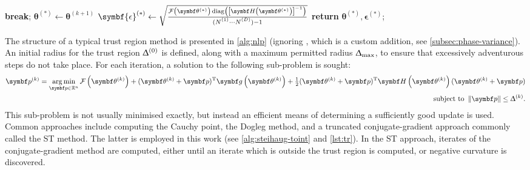 \begin{algorithm}
\begin{algorithmic}[1]
                \EndIf\label{state:neg-amp-end}
                    \State \textbf{break};
                \EndIf
            \EndFor
            \State $\symbf{\theta}^{(*)} \gets \symbf{\theta}^{(k+1)}$
            \State $\symbf{\epsilon}^{(*)} \gets
                \sqrt{
                    \frac
                    {
                        \Fthstar \diag \left(
                            \left[\bdHthstar\right]^{-1}
                        \right)
                    }
                    {(\None \cdots \ND) - 1}
                }$
            \State \textbf{return} $\symbf{\theta}^{(*)}, \symbf{\epsilon}^{(*)}$;
        \EndProcedure
    \end{algorithmic}
\end{algorithm}
The structure of a typical trust region method is presented in
\cref{alg:nlp} (ignoring , which is a custom addition,
see \cref{subsec:phase-variance}). An initial radius for the trust region
$\Updelta^{(0)}$ is defined, along with a maximum permitted radius
$\Updelta_{\text{max}}$, to ensure that excessively adventurous steps do not take place.
For each iteration, a solution to the following sub-problem is sought:
\begin{equation}
    \begin{split}
        \bpk = \argmin_{\bp \in \mathbb{R}^{n}}
            \Fthk +
            (\bthk + \bp)\T \bdgthk +
            \tfrac{1}{2} (\bthk + \bp)\T \bdHthk (\bthk + \bp) \\
        \text{subject to } \left \lVert \bp \right \rVert \leq \trustradius{k}.
    \end{split}
\end{equation}
This sub-problem is not usually minimised exactly, but instead an efficient
means of determining a sufficiently good update is used.
Common approaches include computing the Cauchy point, the Dogleg
method, and a truncated conjugate-gradient
approach commonly called the \ac{ST} method\cite[Chapter 7]{Nocedal2006}.
The latter is employed in this work (see \cref{alg:steihaug-toint} and
\cref{lst:tr}). In the \ac{ST} approach, iterates of the conjugate-gradient
method\cite[Chapter 5]{Nocedal2006} are computed, either until an iterate which
is outside the trust region is computed, or negative curvature is discovered.

